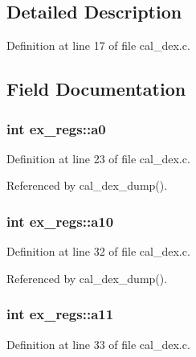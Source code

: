 \subsection{Detailed Description}


Definition at line 17 of file cal\+\_\+dex.\+c.



\subsection{Field Documentation}
\subsubsection[{\texorpdfstring{a0}{a0}}]{\setlength{\rightskip}{0pt plus 5cm}int ex\+\_\+regs\+::a0}\hypertarget{structex__regs_ab9e470c41e6c89050e83f07ba3d020a6}{}\label{structex__regs_ab9e470c41e6c89050e83f07ba3d020a6}


Definition at line 23 of file cal\+\_\+dex.\+c.



Referenced by cal\+\_\+dex\+\_\+dump().

\subsubsection[{\texorpdfstring{a10}{a10}}]{\setlength{\rightskip}{0pt plus 5cm}int ex\+\_\+regs\+::a10}\hypertarget{structex__regs_af85ef649abe139889371e7bbecad73ad}{}\label{structex__regs_af85ef649abe139889371e7bbecad73ad}


Definition at line 32 of file cal\+\_\+dex.\+c.



Referenced by cal\+\_\+dex\+\_\+dump().

\subsubsection[{\texorpdfstring{a11}{a11}}]{\setlength{\rightskip}{0pt plus 5cm}int ex\+\_\+regs\+::a11}\hypertarget{structex__regs_a94aedd1e40a7f814340b845ba35c6b62}{}\label{structex__regs_a94aedd1e40a7f814340b845ba35c6b62}


Definition at line 33 of file cal\+\_\+dex.\+c.




